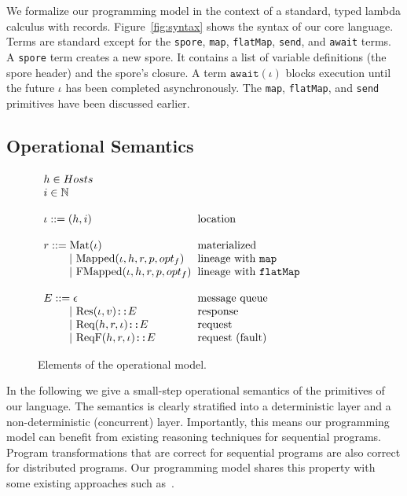 \documentclass[10pt]{sigplanconf}
\theoremstyle{definition}
\theoremstyle{definition}
\newcommand{\gap}{\quad\quad}
\newcommand{\ba}{\begin{array}}
\newcommand{\ea}{\end{array}}
\begin{document}
We formalize our programming model in the context of a standard, typed lambda
calculus with records. Figure~\ref{fig:syntax} shows the syntax of our core
language. Terms are standard except for the \texttt{spore}, \texttt{map},
\texttt{flatMap}, \texttt{send}, and \texttt{await} terms. A \texttt{spore}
term creates a new spore. It contains a list of variable definitions (the spore
header) and the spore's closure. A term $\texttt{await}(\iota)$ blocks
execution until the future $\iota$ has been completed asynchronously. The
\texttt{map}, \texttt{flatMap}, and \texttt{send} primitives have been
discussed earlier.

\subsection{Operational Semantics}
\label{sec:opsem}

\begin{figure}[ht!]
  \centering

  $\ba[t]{l@{\hspace{2mm}}l}
h \in Hosts &
\\
i \in \mathbb{N} &
\\
 & \\
\iota  ::=  (h, i)                               & \mbox{location}
\\
 & \\
r ::=     \text{Mat}(\iota) & \mbox{materialized}
\\
\gap ~|~  \text{Mapped}(\iota, h, r, p, opt_f)   & \mbox{lineage with \texttt{map}}
\\
\gap ~|~  \text{FMapped}(\iota, h, r, p, opt_f)  & \mbox{lineage with \texttt{flatMap}}
\\
 & \\
E      ::=  \epsilon & \mbox{message queue}
\\
\gap ~|~    \text{Res}(\iota, v) \texttt{::} E      & \mbox{response}
\\
\gap ~|~    \text{Req}(h, r, \iota) \texttt{::} E   & \mbox{request}
\\
\gap ~|~    \text{ReqF}(h, r, \iota) \texttt{::} E  & \mbox{request (fault)}
\\
  \ea$

  \vspace{1mm}
  \caption{Elements of the operational model.}
  \label{fig:elems-opsem}
  \vspace{1mm}
\end{figure}

In the following we give a small-step operational semantics of the primitives
of our language. The semantics is clearly stratified into a deterministic layer
and a non-deterministic (concurrent) layer. Importantly, this means our
programming model can benefit from existing reasoning techniques for sequential
programs. Program transformations that are correct for sequential programs are
also correct for distributed programs. Our programming model shares this
property with some existing approaches such as~\cite{ConcurrentHaskell}.
\end{document}

